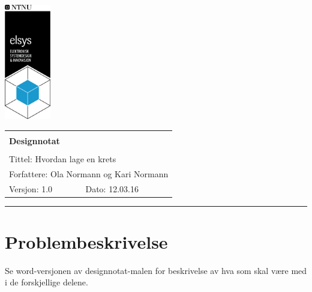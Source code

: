 \documentclass[a4paper,11pt,norsk]{article}
\begin{document}
\begin{minipage}[c]{0.15\textwidth}
\includegraphics[width=2.0cm]{elsys_pos_staaende_ntnu}  
\end{minipage}
\begin{minipage}[c]{0.85\textwidth}

\renewcommand{\arraystretch}{1.7}
\large 
\begin{tabularx}{\textwidth}{|X|X|}
\hline
\multicolumn{2}{|l|}{} \\
\multicolumn{2}{|l|}{\huge \textbf{Designnotat}} \\
\multicolumn{2}{|l|}{}  \\
\hline
\multicolumn{2}{|l|}{Tittel: 
Hvordan lage en krets
} \\
\hline
\multicolumn{2}{|l|}{Forfattere: 
Ola Normann og Kari Normann
} \\
\hline
Versjon: 1.0 & Dato: 12.03.16
\\
\hline 
\end{tabularx}
\end{minipage}
\normalsize


\setlength{\parskip}{0ex}
\renewcommand{\baselinestretch}{0.1}\normalsize
\tableofcontents
\renewcommand{\baselinestretch}{1.00}\normalsize
\setlength{\parskip}{2ex}
\rule{\textwidth}{1pt}

\section{Problembeskrivelse}
\label{sec:innledning}

Se word-versjonen av designnotat-malen for beskrivelse av hva som skal være med i de forskjellige delene.
\end{document}
